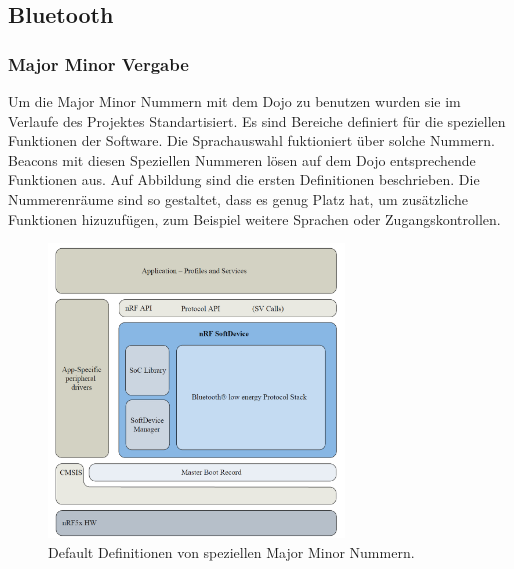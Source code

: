 \subsection{Bluetooth}\label{sec:bluetooth}


\subsubsection{Major Minor Vergabe}
Um die Major Minor Nummern mit dem Dojo zu benutzen wurden sie im Verlaufe des Projektes Standartisiert. Es sind Bereiche definiert für die speziellen Funktionen der Software. Die Sprachauswahl fuktioniert über solche Nummern. Beacons mit diesen Speziellen Nummeren lösen auf dem Dojo entsprechende Funktionen aus. Auf Abbildung  sind die ersten Definitionen beschrieben. Die Nummerenräume sind so gestaltet, dass es genug Platz hat, um zusätzliche Funktionen hizuzufügen, zum Beispiel weitere Sprachen oder Zugangskontrollen.

\begin{figure}[htbp!!!!]
	\centering
	\includegraphics[width=0.7\textwidth]{Data/Software_Layers.PNG}
	\caption[Software:Definierte MM]{Default Definitionen von speziellen Major Minor Nummern.}
	\label{fig:Bluetooth_def_MM}
\end{figure}



